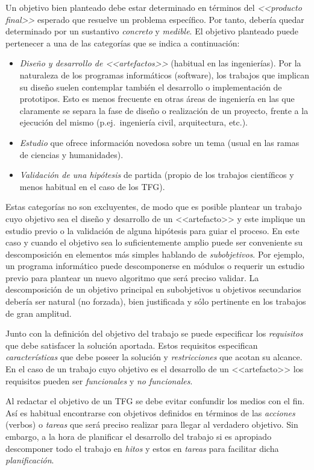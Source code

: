 Un objetivo bien planteado debe estar determinado en términos del \emph{<<producto final>>} esperado que resuelve un problema específico. Por tanto, debería quedar determinado por un sustantivo \emph{concreto} y \emph{medible}. El objetivo planteado puede pertenecer a una de las categorías que se indica a continuación:
\begin{itemize}
	\item \emph{Diseño y desarrollo de <<artefactos>>}
	(habitual en las ingenierías). Por la naturaleza de los programas informáticos (software), los trabajos que implican su diseño suelen contemplar también el desarrollo o implementación de prototipos. Esto es menos frecuente en otras áreas de ingeniería en las que claramente se separa la fase de diseño o realización de un proyecto, frente a la ejecución del mismo (p.ej.~ingeniería civil, arquitectura, etc.). 
	\item \emph{Estudio} que ofrece información novedosa sobre un tema (usual en las ramas de ciencias y humanidades). 
	\item \emph{Validación de una 
	hipótesis} de partida (propio de los trabajos 
	científicos y menos habitual en el caso de los TFG).
\end{itemize}

Estas categorías no son excluyentes, de modo que es posible plantear un trabajo cuyo objetivo sea el diseño y desarrollo de un <<artefacto>> y este implique un estudio previo o la validación de alguna hipótesis para guiar el proceso. En este caso y cuando el objetivo sea lo suficientemente amplio puede ser conveniente su descomposición en elementos más simples hablando de \emph{subobjetivos}. Por ejemplo, un programa informático puede descomponerse en módulos o requerir un estudio previo para plantear un nuevo algoritmo que será preciso validar. La descomposición de un objetivo principal en subobjetivos 
u objetivos secundarios debería ser natural (no forzada), bien justificada y 
sólo pertinente en los trabajos de gran amplitud.

Junto con la definición del objetivo del trabajo se puede especificar los \emph{requisitos} que debe satisfacer la solución aportada. Estos requisitos especifican \emph{características} que debe poseer la solución y \emph{restricciones} que acotan su alcance. En el caso de un trabajo cuyo objetivo es el desarrollo de un <<artefacto>> los requisitos pueden ser \emph{funcionales} y \emph{no funcionales}.

Al redactar el objetivo de un TFG se debe evitar confundir los medios con el 
fin. Así es habitual encontrarse con objetivos definidos en términos de las 
\emph{acciones} (verbos) o \emph{tareas} que será preciso 
realizar para llegar al verdadero objetivo. Sin embargo, a la hora de 
planificar el desarrollo del trabajo si es apropiado descomponer todo el 
trabajo en \emph{hitos} y estos en \emph{tareas} para facilitar dicha 
\emph{planificación}.

